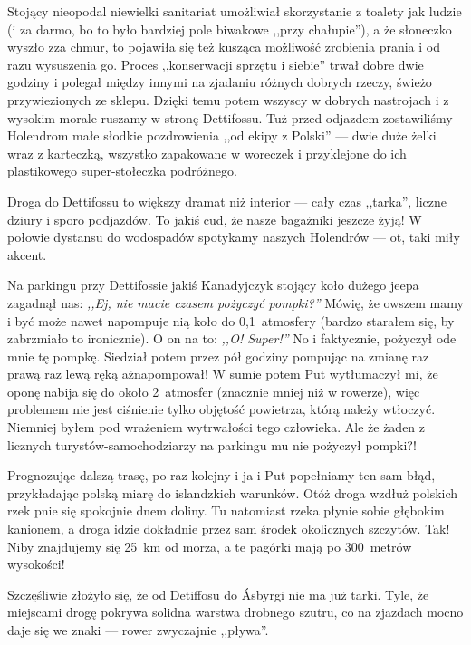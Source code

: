 Stojący nieopodal niewielki sanitariat umożliwiał skorzystanie z toalety jak ludzie (i za darmo, bo to było bardziej pole biwakowe ,,przy chałupie''), a że słoneczko wyszło zza chmur, to pojawiła się też kusząca możliwość zrobienia prania i od razu wysuszenia go. Proces ,,konserwacji sprzętu i siebie'' trwał dobre dwie godziny i polegał między innymi na zjadaniu różnych dobrych rzeczy, świeżo przywiezionych ze sklepu. Dzięki temu potem wszyscy w dobrych nastrojach i z wysokim morale ruszamy w stronę Dettifossu. Tuż przed odjazdem zostawiliśmy Holendrom małe słodkie pozdrowienia ,,od ekipy z Polski'' --- dwie duże żelki wraz z karteczką, wszystko zapakowane w woreczek i przyklejone do ich plastikowego super-stołeczka podróżnego.

Droga do Dettifossu to większy dramat niż interior --- cały czas ,,tarka'', liczne dziury i sporo podjazdów. To jakiś cud, że nasze bagażniki jeszcze żyją! W połowie dystansu do wodospadów spotykamy naszych Holendrów --- ot, taki miły akcent.


Na parkingu przy Dettifossie jakiś Kanadyjczyk stojący koło dużego jeepa zagadnął nas: \emph{,,Ej, nie macie czasem pożyczyć pompki?''} Mówię, że owszem mamy i być może nawet napompuje nią koło do 0,1~atmosfery (bardzo starałem się, by zabrzmiało to ironicznie). O on na to: \emph{,,O! Super!''} No i faktycznie, pożyczył ode mnie tę pompkę. Siedział potem przez pół godziny pompując na zmianę raz prawą raz lewą ręką aż\textellipsis napompował! W sumie potem Put wytłumaczył mi, że oponę nabija się do około 2~atmosfer (znacznie mniej niż w rowerze), więc problemem nie jest ciśnienie tylko objętość powietrza, którą należy wtłoczyć. Niemniej byłem pod wrażeniem wytrwałości tego człowieka. Ale że żaden z licznych turystów-samochodziarzy na parkingu mu nie pożyczył pompki?!

Prognozując dalszą trasę, po raz kolejny i ja i Put popełniamy ten sam błąd, przykładając polską miarę do islandzkich warunków. Otóż droga wzdłuż polskich rzek pnie się spokojnie dnem doliny. Tu natomiast rzeka płynie sobie głębokim kanionem, a droga idzie dokładnie przez sam środek okolicznych szczytów. Tak! Niby znajdujemy się 25~km od morza, a te pagórki mają po 300~metrów wysokości!

Szczęśliwie złożyło się, że od Detiffosu do Ásbyrgi nie ma już tarki. Tyle, że miejscami drogę pokrywa solidna warstwa drobnego szutru, co na zjazdach mocno daje się we znaki --- rower zwyczajnie ,,pływa''.

